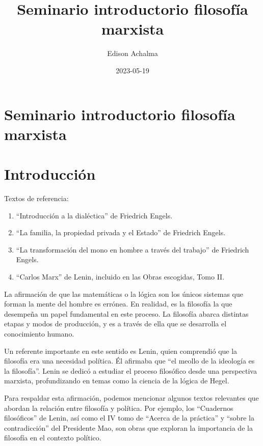 \documentclass[
  jou,
  floatsintext,
  longtable,
  a4paper,
  nolmodern,
  notxfonts,
  notimes,
  12pt,
  colorlinks=true,linkcolor=blue,citecolor=blue,urlcolor=blue]{apa7}
\title{Seminario introductorio filosofía marxista}
\author{Edison Achalma}
\affiliation{
{Escuela Profesional de Economía, Universidad Nacional de San Cristóbal
de Huamanga}}
\date{2023-05-19}
\begin{document}
\maketitle


\hypertarget{toc}{}
\tableofcontents
\newpage
\section[Introduction]{Seminario introductorio filosofía marxista}

\setcounter{secnumdepth}{3}

\setlength\LTleft{0pt}




\section{Introducción}\label{introducciuxf3n}

Textos de referencia:

\begin{enumerate}
\def\labelenumi{\arabic{enumi}.}
\item
  ``Introducción a la dialéctica'' de Friedrich Engels.
\item
  ``La familia, la propiedad privada y el Estado'' de Friedrich Engels.
\item
  ``La transformación del mono en hombre a través del trabajo'' de
  Friedrich Engels.
\item
  ``Carlos Marx'' de Lenin, incluido en las Obras escogidas, Tomo II.
\end{enumerate}

La afirmación de que las matemáticas o la lógica son los únicos sistemas
que forman la mente del hombre es errónea. En realidad, es la filosofía
la que desempeña un papel fundamental en este proceso. La filosofía
abarca distintas etapas y modos de producción, y es a través de ella que
se desarrolla el conocimiento humano.

Un referente importante en este sentido es Lenin, quien comprendió que
la filosofía era una necesidad política. Él afirmaba que ``el meollo de
la ideología es la filosofía''. Lenin se dedicó a estudiar el proceso
filosófico desde una perspectiva marxista, profundizando en temas como
la ciencia de la lógica de Hegel.

Para respaldar esta afirmación, podemos mencionar algunos textos
relevantes que abordan la relación entre filosofía y política. Por
ejemplo, los ``Cuadernos filosóficos'' de Lenin, así como el IV tomo de
``Acerca de la práctica'' y ``sobre la contradicción'' del Presidente
Mao, son obras que exploran la importancia de la filosofía en el
contexto político.
\end{document}
